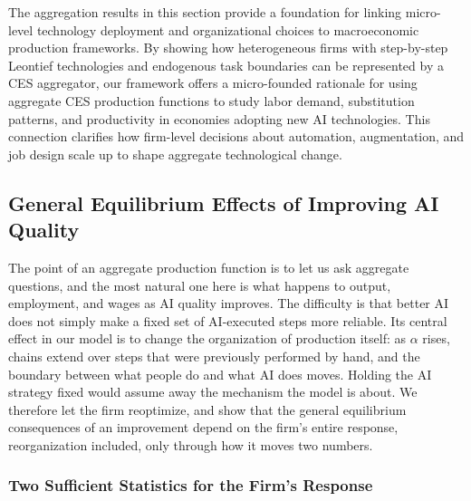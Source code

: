 The aggregation results in this section provide a foundation for linking micro-level technology deployment and organizational choices to macroeconomic production frameworks.
By showing how heterogeneous firms with step-by-step Leontief technologies and endogenous task boundaries can be represented by a CES aggregator, our framework offers a micro-founded rationale for using aggregate CES production functions to study labor demand, substitution patterns, and productivity in economies adopting new AI technologies.
This connection clarifies how firm-level decisions about automation, augmentation, and job design scale up to shape aggregate technological change.



\subsection{General Equilibrium Effects of Improving AI Quality}
\label{sec:agg_compstat}

The point of an aggregate production function is to let us ask aggregate questions, and the most natural one here is what happens to output, employment, and wages as AI quality improves.
The difficulty is that better AI does not simply make a fixed set of AI-executed steps more reliable.
Its central effect in our model is to change the organization of production itself: as $\alpha$ rises, chains extend over steps that were previously performed by hand, and the boundary between what people do and what AI does moves.
Holding the AI strategy fixed would assume away the mechanism the model is about.
We therefore let the firm reoptimize, and show that the general equilibrium consequences of an improvement depend on the firm's entire response, reorganization included, only through how it moves two numbers.

\subsubsection*{Two Sufficient Statistics for the Firm's Response}

